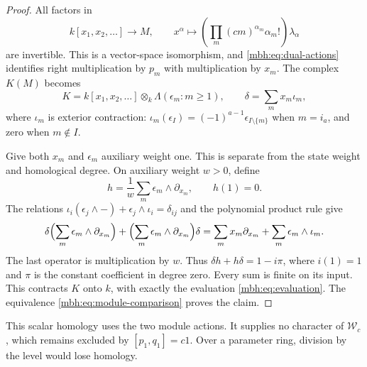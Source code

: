 \begin{proof}
All factors in
\begin{equation}\label{mbh:eq:fixed-normalization}
 k[x_1,x_2,\ldots]\longrightarrow M,\qquad
 x^\alpha\longmapsto
 \left(\prod_m(cm)^{\alpha_m}\alpha_m!\right)\lambda_\alpha
\end{equation}
are invertible.  This is a vector-space isomorphism, and
\eqref{mbh:eq:dual-actions} identifies right multiplication by
\(p_m\) with multiplication by \(x_m\).
The complex \(K(M)\) becomes
\[
 K=k[x_1,x_2,\ldots]\otimes_k\Lambda(\epsilon_m:m\ge1),
 \qquad
 \delta=\sum_m x_m\iota_m,
\]
where \(\iota_m\) is exterior contraction:
\(\iota_m(\epsilon_I)=(-1)^{a-1}
\epsilon_{I\setminus\{m\}}\) when \(m=i_a\), and zero
when \(m\notin I\).

Give both \(x_m\) and \(\epsilon_m\) auxiliary weight one.
This is separate from the state weight and homological degree.
On auxiliary weight \(w>0\), define
\begin{equation}\label{mbh:eq:euler-homotopy}
 h=\frac1w\sum_m\epsilon_m\wedge\partial_{x_m},
 \qquad h(1)=0.
\end{equation}
The relations
\(\iota_i(\epsilon_j\wedge-)+\epsilon_j\wedge\iota_i
=\delta_{ij}\) and the polynomial product rule give
\[
 \delta\Bigl(\sum_m\epsilon_m\wedge\partial_{x_m}\Bigr)
 +\Bigl(\sum_m\epsilon_m\wedge\partial_{x_m}\Bigr)\delta
 =\sum_m x_m\partial_{x_m}+\sum_m\epsilon_m\wedge\iota_m.
\]
The last operator is multiplication by \(w\).
Thus \(\delta h+h\delta=1-i\pi\), where \(i(1)=1\) and
\(\pi\) is the constant coefficient in degree zero.
Every sum is finite on its input.  This contracts \(K\) onto
\(k\), with exactly the evaluation \eqref{mbh:eq:evaluation}.
The equivalence \eqref{mbh:eq:module-comparison} proves the claim.
\end{proof}

This scalar homology uses the two module actions.
It supplies no character of \(\mathscr W_c\), which remains
excluded by \([p_1,q_1]=c1\).
Over a parameter ring, division by the level would lose homology.

